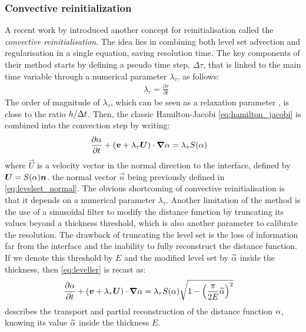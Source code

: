 \subsubsection{Convective reinitialization}
%
A recent work by \citet{ville_convected_2011} introduced another concept for reinitialisation 
called the \emph{convective reinitialisation}. The idea lies in combining both level set advection 
and regularisation in a single equation, saving resolution time. The key components of their method
starts by defining a pseudo time step, $\Delta \tau$, that is linked to the main time variable through
a numerical parameter $\lambda_\tau$, as follows:
\begin{align}
\label{eq:pseudotimestep}
& \lambda_\tau = \frac{\partial \tau}{ \partial t}
\end{align}
The order of magnitude of $\lambda_\tau$, which can be seen as a relaxation parameter \citep[see][89]{vigneaux_methodes_2007}, 
is close to the ratio $h/\Delta t$. Then, the classic Hamilton-Jacobi 
\cref{eq:hamilton_jacobi} is combined into the convection step by writing:
\begin{align}
\label{eq:leveller}
& \frac{\partial \alpha}{ \partial t} + \left( \boldsymbol{v} + \lambda_\tau \boldsymbol{U} \right) \cdot \boldsymbol{\nabla} \alpha = \lambda_\tau S(\alpha)
\end{align}
where $\vec{U}$ is a velocity vector in the normal direction to the interface, defined by $\boldsymbol{U}= S(\alpha) \boldsymbol{n}$.
the normal vector $\vec{n}$ being previously defined in \cref{eq:levelset_normal}.
The obvious shortcoming of convective reinitialisation is that it depends on a numerical parameter $\lambda_\tau$.
Another limitation of the method is the use of a sinusoidal filter to modify the distance function by truncating
its values beyond a thickness threshold, which is also another parameter to calibrate the resolution. The drawback
of truncating the level set is the loss of information far from the interface and the inability to fully reconstruct
the distance function.
If we denote this threshold by $E$ and the modified level set by $\widetilde{\alpha}$ inside the thickness, 
then \cref{eq:leveller} is recast as:
\begin{align}
\label{eq:leveller_s}
& \frac{\partial \alpha}{ \partial t} + \left( \boldsymbol{v} + 
\lambda_\tau \boldsymbol{U} \right) \cdot \boldsymbol{\nabla} \alpha = \lambda_\tau S(\alpha)
\sqrt{1-\left( \frac{\pi}{2 E} \widetilde{\alpha} \right)^2}
\end{align}
 describes the transport and partial reconstruction of the distance function $\alpha$,
knowing its value $\widetilde{\alpha}$ inside the thickness $E$. 
%
